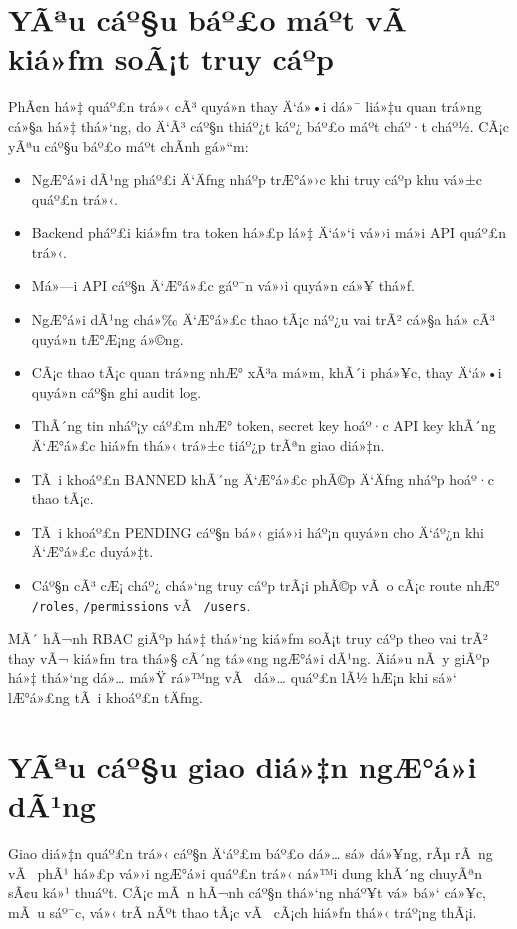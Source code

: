 ﻿\documentclass[12pt,a4paper]{report}
\begin{document}
\section{YÃªu cáº§u báº£o máº­t vÃ  kiá»ƒm soÃ¡t truy cáº­p}

PhÃ¢n há»‡ quáº£n trá»‹ cÃ³ quyá»n thay Ä‘á»•i dá»¯ liá»‡u quan trá»ng cá»§a há»‡ thá»‘ng, do Ä‘Ã³ cáº§n thiáº¿t káº¿ báº£o máº­t cháº·t cháº½. CÃ¡c yÃªu cáº§u báº£o máº­t chÃ­nh gá»“m:

\begin{itemize}
    \item NgÆ°á»i dÃ¹ng pháº£i Ä‘Äƒng nháº­p trÆ°á»›c khi truy cáº­p khu vá»±c quáº£n trá»‹.
    \item Backend pháº£i kiá»ƒm tra token há»£p lá»‡ Ä‘á»‘i vá»›i má»i API quáº£n trá»‹.
    \item Má»—i API cáº§n Ä‘Æ°á»£c gáº¯n vá»›i quyá»n cá»¥ thá»ƒ.
    \item NgÆ°á»i dÃ¹ng chá»‰ Ä‘Æ°á»£c thao tÃ¡c náº¿u vai trÃ² cá»§a há» cÃ³ quyá»n tÆ°Æ¡ng á»©ng.
    \item CÃ¡c thao tÃ¡c quan trá»ng nhÆ° xÃ³a má»m, khÃ´i phá»¥c, thay Ä‘á»•i quyá»n cáº§n ghi audit log.
    \item ThÃ´ng tin nháº¡y cáº£m nhÆ° token, secret key hoáº·c API key khÃ´ng Ä‘Æ°á»£c hiá»ƒn thá»‹ trá»±c tiáº¿p trÃªn giao diá»‡n.
    \item TÃ i khoáº£n BANNED khÃ´ng Ä‘Æ°á»£c phÃ©p Ä‘Äƒng nháº­p hoáº·c thao tÃ¡c.
    \item TÃ i khoáº£n PENDING cáº§n bá»‹ giá»›i háº¡n quyá»n cho Ä‘áº¿n khi Ä‘Æ°á»£c duyá»‡t.
    \item Cáº§n cÃ³ cÆ¡ cháº¿ chá»‘ng truy cáº­p trÃ¡i phÃ©p vÃ o cÃ¡c route nhÆ° \texttt{/roles}, \texttt{/permissions} vÃ  \texttt{/users}.
\end{itemize}

MÃ´ hÃ¬nh RBAC giÃºp há»‡ thá»‘ng kiá»ƒm soÃ¡t truy cáº­p theo vai trÃ² thay vÃ¬ kiá»ƒm tra thá»§ cÃ´ng tá»«ng ngÆ°á»i dÃ¹ng. Äiá»u nÃ y giÃºp há»‡ thá»‘ng dá»… má»Ÿ rá»™ng vÃ  dá»… quáº£n lÃ½ hÆ¡n khi sá»‘ lÆ°á»£ng tÃ i khoáº£n tÄƒng.

\section{YÃªu cáº§u giao diá»‡n ngÆ°á»i dÃ¹ng}

Giao diá»‡n quáº£n trá»‹ cáº§n Ä‘áº£m báº£o dá»… sá»­ dá»¥ng, rÃµ rÃ ng vÃ  phÃ¹ há»£p vá»›i ngÆ°á»i quáº£n trá»‹ ná»™i dung khÃ´ng chuyÃªn sÃ¢u ká»¹ thuáº­t. CÃ¡c mÃ n hÃ¬nh cáº§n thá»‘ng nháº¥t vá» bá»‘ cá»¥c, mÃ u sáº¯c, vá»‹ trÃ­ nÃºt thao tÃ¡c vÃ  cÃ¡ch hiá»ƒn thá»‹ tráº¡ng thÃ¡i.
\end{document}

